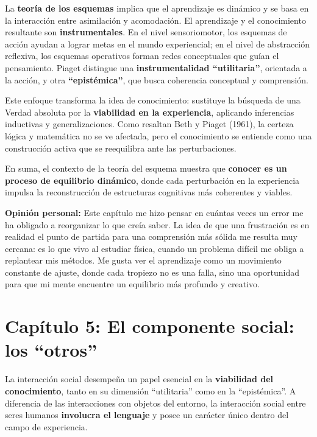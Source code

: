 \documentclass{article}
\begin{document}
La \textbf{teoría de los esquemas} implica que el aprendizaje es dinámico y se basa en la interacción entre asimilación y acomodación. El aprendizaje y el conocimiento resultante son \textbf{instrumentales}. En el nivel sensoriomotor, los esquemas de acción ayudan a lograr metas en el mundo experiencial; en el nivel de abstracción reflexiva, los esquemas operativos forman redes conceptuales que guían el pensamiento. Piaget distingue una \textbf{instrumentalidad “utilitaria”}, orientada a la acción, y otra \textbf{“epistémica”}, que busca coherencia conceptual y comprensión.

Este enfoque transforma la idea de conocimiento: sustituye la búsqueda de una Verdad absoluta por la \textbf{viabilidad en la experiencia}, aplicando inferencias inductivas y generalizaciones. Como resaltan Beth y Piaget (1961), la certeza lógica y matemática no se ve afectada, pero el conocimiento se entiende como una construcción activa que se reequilibra ante las perturbaciones.

En suma, el contexto de la teoría del esquema muestra que \textbf{conocer es un proceso de equilibrio dinámico}, donde cada perturbación en la experiencia impulsa la reconstrucción de estructuras cognitivas más coherentes y viables.

\textbf{Opinión personal:}  
Este capítulo me hizo pensar en cuántas veces un error me ha obligado a reorganizar lo que creía saber. La idea de que una frustración es en realidad el punto de partida para una comprensión más sólida me resulta muy cercana: es lo que vivo al estudiar física, cuando un problema difícil me obliga a replantear mis métodos. Me gusta ver el aprendizaje como un movimiento constante de ajuste, donde cada tropiezo no es una falla, sino una oportunidad para que mi mente encuentre un equilibrio más profundo y creativo.

\section*{Capítulo 5: El componente social: los “otros”}

La interacción social desempeña un papel esencial en la \textbf{viabilidad del conocimiento}, tanto en su dimensión “utilitaria” como en la “epistémica”. A diferencia de las interacciones con objetos del entorno, la interacción social entre seres humanos \textbf{involucra el lenguaje} y posee un carácter único dentro del campo de experiencia.
\end{document}
